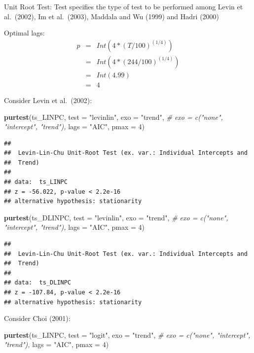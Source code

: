 \documentclass[
]{book}
\newenvironment{Shaded}{\begin{snugshade}}{\end{snugshade}}
\newcommand{\AttributeTok}[1]{\textcolor[rgb]{0.13,0.29,0.53}{#1}}
\newcommand{\CommentTok}[1]{\textcolor[rgb]{0.56,0.35,0.01}{\textit{#1}}}
\newcommand{\DecValTok}[1]{\textcolor[rgb]{0.00,0.00,0.81}{#1}}
\newcommand{\FunctionTok}[1]{\textcolor[rgb]{0.13,0.29,0.53}{\textbf{#1}}}
\newcommand{\NormalTok}[1]{#1}
\newcommand{\StringTok}[1]{\textcolor[rgb]{0.31,0.60,0.02}{#1}}
\begin{document}
Unit Root Test: Test specifies the type of test to be performed among Levin et al.~(2002), Im et al.~(2003), Maddala and Wu (1999) and Hadri (2000)

Optimal lags:
\begin{eqnarray*}
  p & = & Int(4*(T/100)^{(1/4)}) \\
   & = & Int(4*(244/100)^{(1/4)}) \\
   & = & Int(4.99) \\
   & = & 4
\end{eqnarray*}

Consider Levin et al.~(2002):

\begin{Shaded}
\begin{Highlighting}[]
\FunctionTok{purtest}\NormalTok{(ts\_LINPC, }\AttributeTok{test =} \StringTok{"levinlin"}\NormalTok{, }\AttributeTok{exo =} \StringTok{"trend"}\NormalTok{, }\CommentTok{\# exo = c("none", "intercept", "trend"),}
        \AttributeTok{lags =} \StringTok{"AIC"}\NormalTok{, }\AttributeTok{pmax =} \DecValTok{4}\NormalTok{)}
\end{Highlighting}
\end{Shaded}

\begin{verbatim}
## 
##  Levin-Lin-Chu Unit-Root Test (ex. var.: Individual Intercepts and
##  Trend)
## 
## data:  ts_LINPC
## z = -56.022, p-value < 2.2e-16
## alternative hypothesis: stationarity
\end{verbatim}

\begin{Shaded}
\begin{Highlighting}[]
\FunctionTok{purtest}\NormalTok{(ts\_DLINPC, }\AttributeTok{test =} \StringTok{"levinlin"}\NormalTok{, }\AttributeTok{exo =} \StringTok{"trend"}\NormalTok{, }\CommentTok{\# exo = c("none", "intercept", "trend"),}
        \AttributeTok{lags =} \StringTok{"AIC"}\NormalTok{, }\AttributeTok{pmax =} \DecValTok{4}\NormalTok{)}
\end{Highlighting}
\end{Shaded}

\begin{verbatim}
## 
##  Levin-Lin-Chu Unit-Root Test (ex. var.: Individual Intercepts and
##  Trend)
## 
## data:  ts_DLINPC
## z = -107.84, p-value < 2.2e-16
## alternative hypothesis: stationarity
\end{verbatim}

Consider Choi (2001):

\begin{Shaded}
\begin{Highlighting}[]
\FunctionTok{purtest}\NormalTok{(ts\_LINPC, }\AttributeTok{test =} \StringTok{"logit"}\NormalTok{, }\AttributeTok{exo =} \StringTok{"trend"}\NormalTok{, }\CommentTok{\# exo = c("none", "intercept", "trend"),}
        \AttributeTok{lags =} \StringTok{"AIC"}\NormalTok{, }\AttributeTok{pmax =} \DecValTok{4}\NormalTok{)}
\end{Highlighting}
\end{Shaded}
\end{document}
